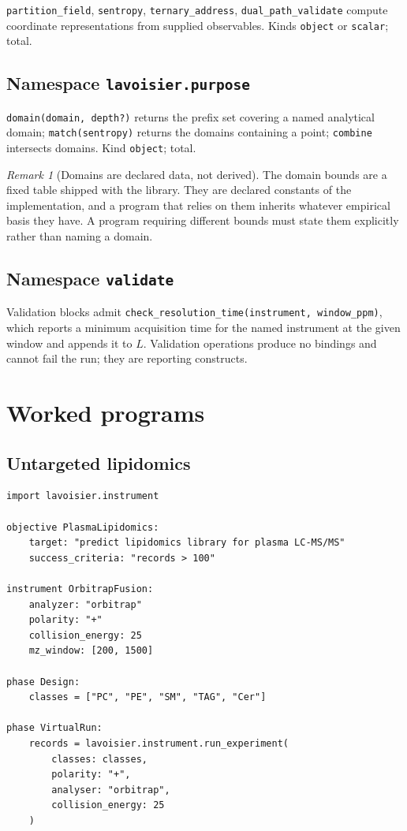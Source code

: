 \documentclass[11pt,twocolumn,a4paper]{article}
\theoremstyle{ssthm}
\theoremstyle{definition}
\theoremstyle{remark}
\newtheorem{remark}[theorem]{Remark}
\newcommand{\shk}[1]{\texttt{#1}}
\begin{document}
\shk{partition\_field}, \shk{sentropy}, \shk{ternary\_address},
\shk{dual\_path\_validate} compute coordinate representations from
supplied observables. Kinds \shk{object} or \shk{scalar}; total.

\subsection{Namespace \shk{lavoisier.purpose}}

\shk{domain(domain, depth?)} returns the prefix set covering a named
analytical domain; \shk{match(sentropy)} returns the domains containing a
point; \shk{combine} intersects domains. Kind \shk{object}; total.

\begin{remark}[Domains are declared data, not derived]
\label{rem:domains}
The domain bounds are a fixed table shipped with the library. They are
declared constants of the implementation, and a program that relies on
them inherits whatever empirical basis they have. A program requiring
different bounds must state them explicitly rather than naming a domain.
\end{remark}

\subsection{Namespace \shk{validate}}

Validation blocks admit \shk{check\_resolution\_time(instrument,
window\_ppm)}, which reports a minimum acquisition time for the named
instrument at the given window and appends it to $L$. Validation
operations produce no bindings and cannot fail the run; they are
reporting constructs.

\section{Worked programs}
\label{sec:programs}

\subsection{Untargeted lipidomics}

\begin{lstlisting}[caption={Untargeted lipid library over five classes.}]
import lavoisier.instrument

objective PlasmaLipidomics:
    target: "predict lipidomics library for plasma LC-MS/MS"
    success_criteria: "records > 100"

instrument OrbitrapFusion:
    analyzer: "orbitrap"
    polarity: "+"
    collision_energy: 25
    mz_window: [200, 1500]

phase Design:
    classes = ["PC", "PE", "SM", "TAG", "Cer"]

phase VirtualRun:
    records = lavoisier.instrument.run_experiment(
        classes: classes,
        polarity: "+",
        analyser: "orbitrap",
        collision_energy: 25
    )
\end{lstlisting}
\end{document}
